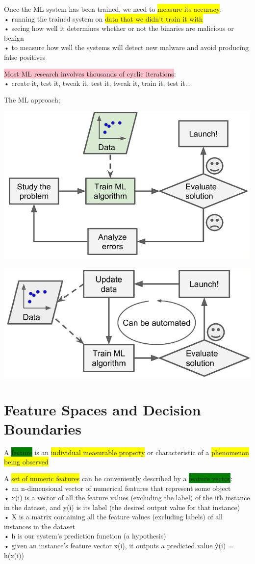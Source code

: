 \documentclass[]{project_plan}
\begin{document}
Once the ML system has been trained, we need to \colorbox{yellow}{measure its accuracy}:\\
• running the trained system on \colorbox{yellow}{data that we didn’t train it with}\\
• seeing how well it determines whether or not the binaries are malicious or benign\\
• to measure how well the systems will detect new malware and avoid producing false positives

\colorbox{pink}{Most ML research involves thousands of cyclic iterations}:\\
• create it, test it, tweak it, test it, tweak it, train it, test it...

The ML approach;

\includegraphics[width=.6\linewidth]{the ml approach.png}

\includegraphics[width=.6\linewidth]{automated ml.png}

\section{Feature Spaces and Decision Boundaries}

A \colorbox{green}{feature} is an \colorbox{yellow}{individual measurable property} or characteristic of a \colorbox{yellow}{phenomenon being observed}

A \colorbox{yellow}{set of numeric features} can be conveniently described by a \colorbox{green}{feature vector}:\\
• an n-dimensional vector of numerical features that represent some object\\
• x(i) is a vector of all the feature values (excluding the label) of the ith instance in the dataset, and y(i) is its label (the desired output value for that instance)\\
• X is a matrix containing all the feature values (excluding labels) of all instances in the dataset\\
• h is our system’s prediction function (a hypothesis)\\
• given an instance’s feature vector x(i), it outputs a predicted value ŷ(i) = h(x(i))
\end{document}
